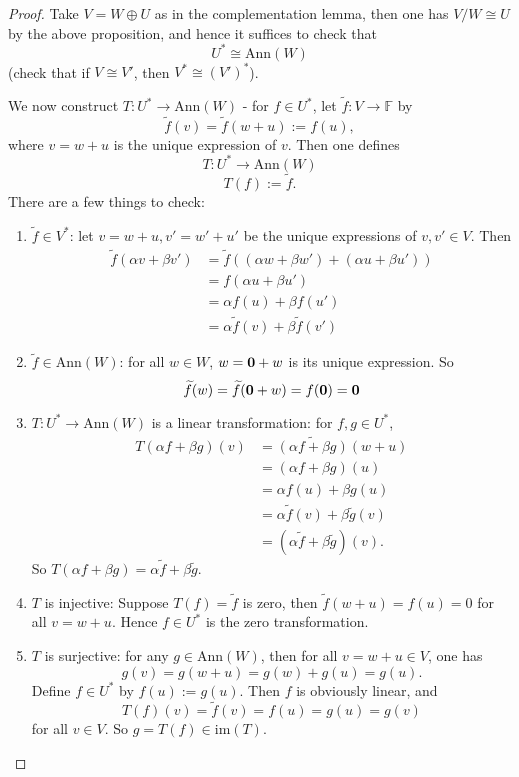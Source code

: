 \documentclass[12pt]{amsbook}
\begin{document}
\begin{proof}
    Take $V = W \oplus U$ as in the complementation lemma, then one has $V/W \cong U$ by the above proposition, and hence it suffices to check that
    $$U^* \cong \mathrm{Ann}(W)$$
    (check that if $V \cong V'$, then $V^* \cong (V')^*$). 

    We now construct $T: U^* \to \mathrm{Ann}(W)$ - for $f \in U^*$, let
    $\widetilde{f}: V \to \mathbb{F}$ by
    $$\widetilde{f}(v) = \widetilde{f}(w+u) := f(u),$$
    where $v = w +u$ is the unique expression of $v$. Then one defines
$$T: U^* \to \mathrm{Ann}(W)$$
    $$T(f) := \widetilde{f}.$$
    There are a few things to check:
    \begin{enumerate}
        \item $\widetilde{f} \in V^*$: let $v = w + u, v' = w' + u'$ be the unique expressions of $v, v' \in V$. Then        
        \begin{align*}
        \widetilde{f}(\alpha v + \beta v') &= \widetilde{f}((\alpha w + \beta w') + (\alpha u + \beta u'))\\ &= f(\alpha u + \beta u')\\ &= \alpha f(u) + \beta f(u')\\ &= \alpha \widetilde{f}(v) + \beta \widetilde{f}(v') \end{align*}
        \item $\widetilde{f} \in \mathrm{Ann}(W)$: for all $w \in W$, $w = {\bf 0} + w$ is its unique expression. So
        $$\widetilde{f}(w) = \widetilde{f}({\bf 0} + w) = f(\bf 0) = 0$$
        \item $T: U^* \to \mathrm{Ann}(W)$ is a linear transformation: for  $f, g \in U^*$, 
        \begin{align*}
        T(\alpha f+ \beta g)(v) &= \widetilde{(\alpha f+ \beta g)}(w+u)\\ 
        &= (\alpha f+ \beta g)(u)\\  &= \alpha f(u)+ \beta g(u) \\
        &= \alpha \widetilde{f}(v)+ \beta \widetilde{g}(v) \\
        &= (\alpha \widetilde{f}+ \beta \widetilde{g})(v). \end{align*}
        So $T(\alpha f+ \beta g) = \alpha \widetilde{f}+ \beta \widetilde{g}$.

        \item $T$ is injective: Suppose $T(f) = \widetilde{f}$ is zero, then
        $\widetilde{f}(w+u) = f(u) = 0$ for all $v = w + u$. Hence $f \in U^*$ is the zero transformation.

        \item $T$ is surjective: for any $g \in \mathrm{Ann}(W)$, then for all $v = w + u \in V$, one has
         $$g(v) = g(w+u) = g(w)+g(u) = g(u).$$
        Define $f \in U^*$ by $f(u) := g(u)$. Then $f$ is obviously linear, and 
        $$T(f)(v) = \widetilde{f}(v) = f(u) = g(u) = g(v)$$
        for all $v \in V$. So $g = T(f) \in \mathrm{im}(T)$.
    \end{enumerate}
\end{proof}
\end{document}
